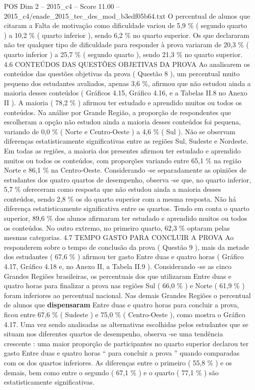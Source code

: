 \begin{textsample}{POS Dim 2 – 2015\_c4 – Score 11.00 – 2015\_c4/enade\_2015\_tec\_des\_mod\_b3edf05b64.txt}
O percentual de alunos que citaram a Falta de motivação como dificuldade variou de 5,9 \% ( segundo quarto ) a 10,2 \% ( quarto inferior ), sendo 6,2 \% no quarto superior.
Os que declararam não ter qualquer tipo de dificuldade para responder à prova variaram de 20,3 \% ( quarto inferior ) a 25,7 \% ( segundo quarto ), sendo 21,3 \% no quarto superior. 4.6 CONTEÚDOS DAS QUESTÕES OBJETIVAS DA PROVA Ao analisarem os conteúdos das questões objetivas da prova ( Questão 8 ), um percentual muito pequeno dos estudantes avaliados, apenas 3,6 \%, afirmou que não estudou ainda a maioria desses conteúdos ( Gráficos 4.15, Gráfico 4.16, e a Tabelas II.8 no Anexo II ).
A maioria ( 78,2 \% ) afirmou ter estudado e aprendido muitos ou todos os conteúdos.
Na análise por Grande Região, a proporção de respondentes que escolheram a opção não estudou ainda a maioria desses conteúdos foi pequena, variando de 0,0 \% ( Norte e Centro-Oeste ) a 4,6 \% ( Sul ).
Não se observam diferenças estatisticamente significativas entre as regiões Sul, Sudeste e Nordeste.
Em todas as regiões, a maioria dos presentes afirmou ter estudado e aprendido muitos ou todos os conteúdos, com proporções variando entre 65,1 \% na região Norte e 86,1 \% na Centro-Oeste.
Considerando -se separadamente as opiniões de estudantes dos quatro quartos de desempenho, observa -se que, no quarto inferior, 5,7 \% ofereceram como resposta que não estudou ainda a maioria desses conteúdos, sendo 2,8 \% os do quarto superior com a mesma resposta.
Não há diferença estatisticamente significativa entre os quartos.
Tendo em conta o quarto superior, 89,6 \% dos alunos afirmaram ter estudado e aprendido muitos ou todos os conteúdos.
No outro extremo, no primeiro quarto, 62,3 \% optaram pelas mesmas categorias. 4.7 TEMPO GASTO PARA CONCLUIR A PROVA Ao responderem sobre o tempo de conclusão da prova ( Questão 9 ), mais da metade dos estudantes ( 67,6 \% ) afirmou ter gasto Entre duas e quatro horas ( Gráfico 4.17, Gráfico 4.18 e, no Anexo II, a Tabela II.9 ).
Considerando -se as cinco Grandes Regiões brasileiras, os percentuais dos que utilizaram Entre duas e quatro horas para finalizar a prova nas regiões Sul ( 66,0 \% ) e Norte ( 61,9 \% ) foram inferiores ao percentual nacional.
Nas demais Grandes Regiões o percentual de alunos que \textbf{dispensaram} Entre duas e quatro horas para concluir a prova, ficou entre 67,6 \% ( Sudeste ) e 75,0 \% ( Centro-Oeste ), como mostra o Gráfico 4.17.
Uma vez sendo analisadas as alternativas escolhidas pelos estudantes que se situam nos diferentes quartos de desempenho, observa -se uma tendência crescente : uma maior proporção de participantes no quarto superior declarou ter gasto Entre duas e quatro horas “ para concluir a prova ” quando comparadas com os dos quartos inferiores.
As diferenças entre o primeiro ( 55,8 \% ) e os demais, bem como entre o segundo ( 67,1 \% ) e o quarto ( 77,1 \% ) são estatisticamente significativas.

\end{textsample}
